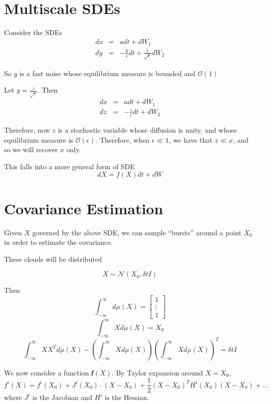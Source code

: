 \documentclass[12pt]{article}
\begin{document}
\section{Multiscale SDEs}

Consider the SDEs
\begin{eqnarray}
dx &=& adt + dW_1\\
dy &=& -\frac{y}{\epsilon} dt + \frac{1}{\sqrt{\epsilon}} dW_2
\end{eqnarray}

So $y$ is a fast noise whose equilibrium measure is bounded and $\mathcal{O}(1)$

Let $y = \frac{z}{\sqrt{\epsilon}}$. Then
\begin{eqnarray}
dx &=& adt + dW_1\\
dz &=& -\frac{z}{\epsilon} dt +  dW_2
\end{eqnarray}

Therefore, now $z$ is a stochastic variable whose diffusion is unity, and whose equilibrium measure is $\mathcal{O}(\epsilon)$. 
%
Therefore, when $\epsilon \ll 1$, we have that $z \ll x$, and so we will recover $x$ only.

This falls into a more general form of SDE
\begin{equation}
dX = f(X) dt + dW
\end{equation}


\section{Covariance Estimation}

Given $X$ governed by the above SDE, we can sample ``bursts'' around a point $X_0$ in order to estimate the covariance. 

These clouds will be distributed 

\begin{equation}
X \sim \mathcal{N}\left( X_0, \delta t I \right)
\end{equation}

Then
$$\int_{-\infty}^{\infty} d\mu(X) = \begin{bmatrix} 1 \\ \vdots \\ 1\end{bmatrix}$$
$$\int_{-\infty}^{\infty} X d\mu(X) = X_0$$
$$\int_{-\infty}^{\infty} X X^T d\mu(X) - \left( \int_{-\infty}^{\infty} X d\mu(X) \right) \left( \int_{-\infty}^{\infty} X d\mu(X) \right)^T = \delta t I$$


We now consider a function $\mathbf{f}(X)$.
%
By Taylor expansion around $X=X_0$,
$$f^i(X) = f^i(X_0) + J^i(X_0) \cdot (X-X_0) + \frac{1}{2} (X-X_0)^T H^i(X_0) (X-X_0) + \dots$$
where $J^i$ is the Jacobian and $H^i$ is the Hessian. 
\end{document}
